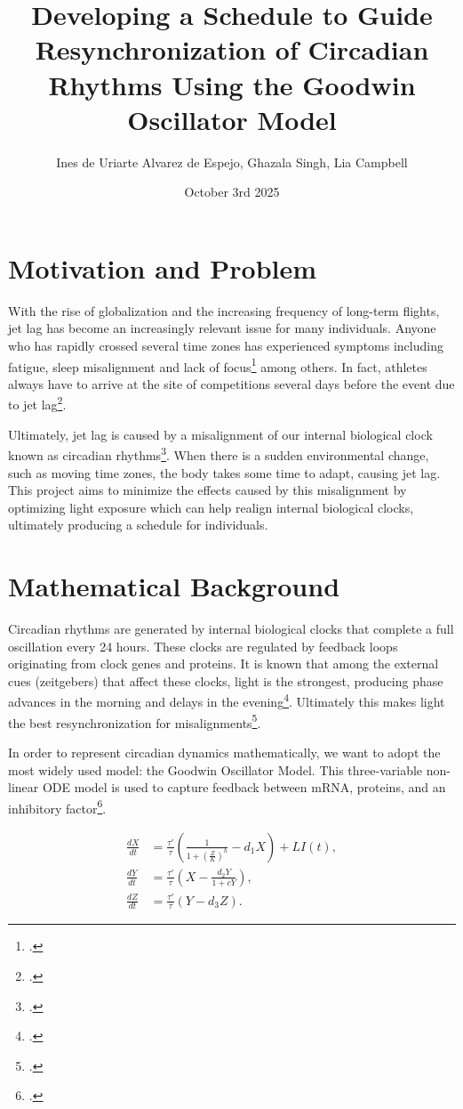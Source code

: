 \documentclass{article}
\title{Developing a Schedule to Guide Resynchronization of Circadian Rhythms Using the Goodwin Oscillator Model}
\author{Ines de Uriarte Alvarez de Espejo, Ghazala Singh, Lia Campbell}
\date{October 3rd 2025}
\begin{document}
\maketitle

\section{Motivation and Problem}
\indent With the rise of globalization and the increasing frequency of long-term flights, jet lag has become an increasingly relevant issue for many individuals. Anyone who has rapidly crossed several time zones has experienced symptoms including fatigue, sleep misalignment and lack of focus\footcite{source1} among others. In fact, athletes always have to arrive at the site of competitions several days before the event due to jet lag\footcite{source2}.

Ultimately, jet lag is caused by a misalignment of our internal biological clock known as circadian rhythms\footcite{source1}. When there is a sudden environmental change, such as moving time zones, the body takes some time to adapt, causing jet lag. This project aims to minimize the effects caused by this misalignment by optimizing light exposure which can help realign internal biological clocks, ultimately producing a schedule for individuals.

\section{Mathematical Background}
\indent Circadian rhythms are generated by internal biological clocks that complete a full oscillation every 24 hours. These clocks are regulated by feedback loops originating from clock genes and proteins. It is known that among the external cues (zeitgebers) that affect these clocks, light is the strongest, producing phase advances in the morning and delays in the evening\footcite{source3}. Ultimately this makes light the best resynchronization for misalignments\footcite{source4}.

In order to represent circadian dynamics mathematically, we want to adopt the most widely used model: the Goodwin Oscillator Model. This three-variable non-linear ODE model is used to capture feedback between mRNA, proteins, and an inhibitory factor\footcite{source5}.

\begin{align}
\frac{dX}{dt} &= \frac{\tau'}{\tau} \left( \frac{1}{1+\left(\tfrac{Z}{K}\right)^{h}} - d_{1}X \right) + L I(t), \\[6pt]
\frac{dY}{dt} &= \frac{\tau'}{\tau} \left( X - \frac{d_{2}Y}{1+cY} \right), \\[6pt]
\frac{dZ}{dt} &= \frac{\tau'}{\tau} \left( Y - d_{3}Z \right).
\end{align}
\end{document}
